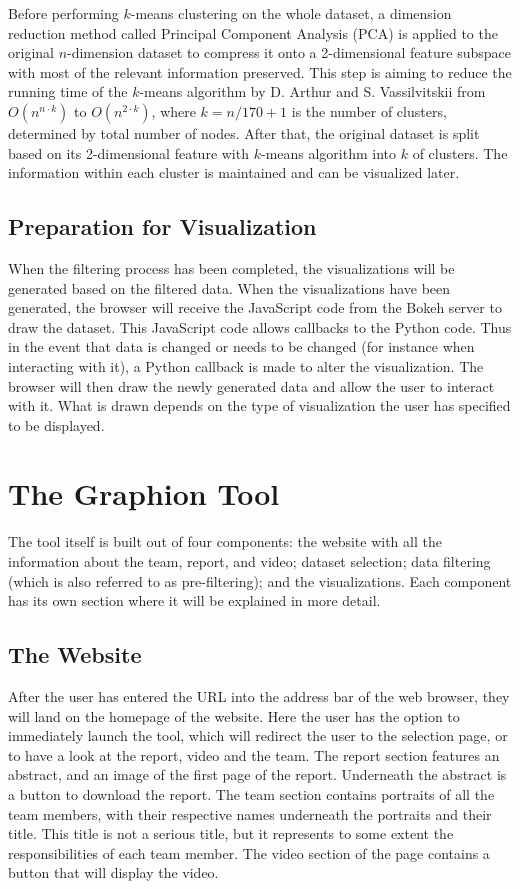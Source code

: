 \documentclass[journal]{vgtc}                %
\begin{document}
Before performing $k$-means clustering on the whole dataset, a dimension reduction method called Principal Component Analysis (PCA)\cite{DBLP:reference/snam/2018} is applied to the original $n$-dimension dataset to compress it onto a 2-dimensional feature subspace with most of the relevant information preserved. This step is aiming to reduce the running time of the $k$-means algorithm by D. Arthur and S. Vassilvitskii \cite{DBLP:conf/compgeom/2006} from $O(n^{n\cdot k})$ to $O(n^{2 \cdot k })$, where $k = n/170 + 1$ is the number of clusters, determined by total number of nodes. After that, the original dataset is split based on its 2-dimensional feature with $k$-means algorithm\cite{DBLP:journals/sigpro/GalluccioMCH12} into $k$ of clusters. The information within each cluster is maintained and can be visualized later.

\subsection{Preparation for Visualization} %
When the filtering process has been completed, the visualizations will be generated based on the filtered data. When the visualizations have been generated, the browser will receive the JavaScript code from the Bokeh server to draw the dataset. This JavaScript code allows callbacks to the Python code. Thus in the event that data is changed or needs to be changed (for instance when interacting with it), a Python callback is made to alter the visualization. The browser will then draw the newly generated data and allow the user to interact with it. What is drawn depends on the type of visualization the user has specified to be displayed.

\section{The Graphion Tool} %
The tool itself is built out of four components: the website with all the information about the team, report, and video; dataset selection; data filtering (which is also referred to as pre-filtering); and the visualizations. Each component has its own section where it will be explained in more detail.

\subsection{The Website} \label{sect:website} %
After the user has entered the URL into the address bar of the web browser, they will land on the homepage of the website. Here the user has the option to immediately launch the tool, which will redirect the user to the selection page, or to have a look at the report, video and the team. The report section features an abstract, and an image of the first page of the report. Underneath the abstract is a button to download the report. The team section contains portraits of all the team members, with their respective names underneath the portraits and their title. This title is not a serious title, but it represents to some extent the responsibilities of each team member. The video section of the page contains a button that will display the video.
\end{document}
